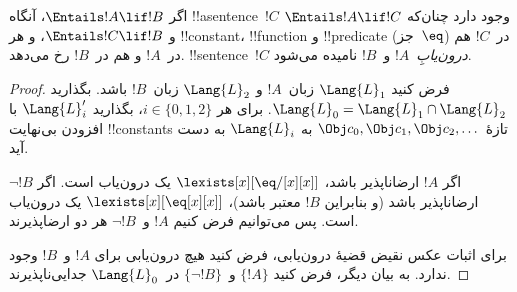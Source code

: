 \documentclass[../../../include/open-logic-section]{subfiles}
\begin{document}


\begin{thm}
اگر $\Entails !A \lif !B$، آنگاه !!a{sentence}~$!C$ وجود دارد چنان‌که
$\Entails !A \lif !C$ و $\Entails !C \lif !B$، و هر !!{constant}،
!!{function} و !!{predicate} (جز~$\eq$) در~$!C$ هم در~$!A$ و هم
در~$!B$ رخ می‌دهد. !!{sentence}~$!C$ \emph{درون‌یابِ}~$!A$ و~$!B$
نامیده می‌شود.
\end{thm}

\begin{proof}
فرض کنید $\Lang{L}_1$ زبان~$!A$ و $\Lang{L}_2$ زبان~$!B$ باشد.
بگذارید $\Lang{L}_0 = \Lang{L}_1 \cap \Lang{L}_2$. برای هر
$i \in \{0, 1, 2 \}$، بگذارید $\Lang{L}'_i$ با افزودن بی‌نهایت
!!{constant}s تازهٔ $\Obj c_0, \Obj c_1, \Obj c_2, \dots$ به
$\Lang{L}_i$ به دست آید.

اگر $!A$ ارضاناپذیر باشد، $\lexists[x][\eq/[x][x]]$ یک درون‌یاب است.
اگر $\lnot !B$ ارضاناپذیر باشد (و بنابراین $!B$ معتبر باشد)،
$\lexists[x][\eq[x][x]]$ یک درون‌یاب است. پس می‌توانیم فرض کنیم
$!A$ و~$\lnot !B$ هر دو ارضاپذیرند.

برای اثبات عکس نقیض قضیهٔ درون‌یابی، فرض کنید هیچ درون‌یابی برای $!A$
و~$!B$ وجود ندارد. به بیان دیگر، فرض کنید $\{!A\}$ و~$\{\lnot !B\}$
در~$\Lang{L}_0$ جدایی‌ناپذیرند.


\end{proof}
\end{document}
